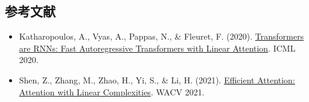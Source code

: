 \FloatBarrier
{}
\hypertarget{ux53c2ux8003ux6587ux732e-98}{%
\subsection{参考文献}\label{ux53c2ux8003ux6587ux732e-98}}

\vspace{0.25em}
\begin{itemize}
\tightlist
\item
  Katharopoulos, A., Vyas, A., Pappas, N., \& Fleuret, F. (2020). \href{https://arxiv.org/abs/2006.16236}{Transformers are RNNs: Fast Autoregressive Transformers with Linear Attention}. ICML 2020.
\item
  Shen, Z., Zhang, M., Zhao, H., Yi, S., \& Li, H. (2021). \href{https://arxiv.org/abs/1812.01243}{Efficient Attention: Attention with Linear Complexities}. WACV 2021.
\end{itemize}

\clearpage
